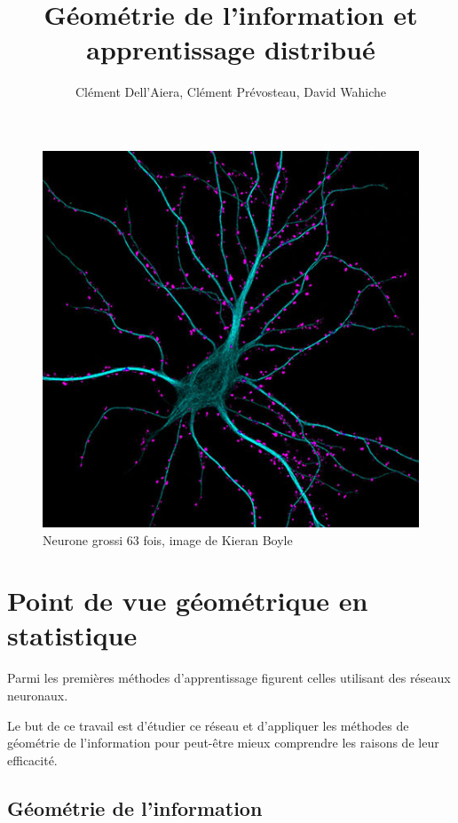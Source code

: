 \documentclass{article}
\title{Géométrie de l'information et apprentissage distribué}
\author{Clément Dell'Aiera, Clément Prévosteau, David Wahiche}
\date{}
\theoremstyle{definition}
\begin{document}
\maketitle

\begin{figure}[h]\centering
\includegraphics[scale=0.6]{Neurone.jpg}
\caption{Neurone grossi 63 fois, image de Kieran Boyle}
\label{fig:Neurone}
\end{figure}

\newpage
\tableofcontents

\newpage
\section{Point de vue géométrique en statistique}

Parmi les premières méthodes d'apprentissage figurent celles utilisant des réseaux neuronaux. %

Le but de ce travail est d'étudier ce réseau et d'appliquer les méthodes de géométrie de l'information pour peut-être mieux comprendre les raisons de leur efficacité.%

\subsection{Géométrie de l'information}
\end{document}
